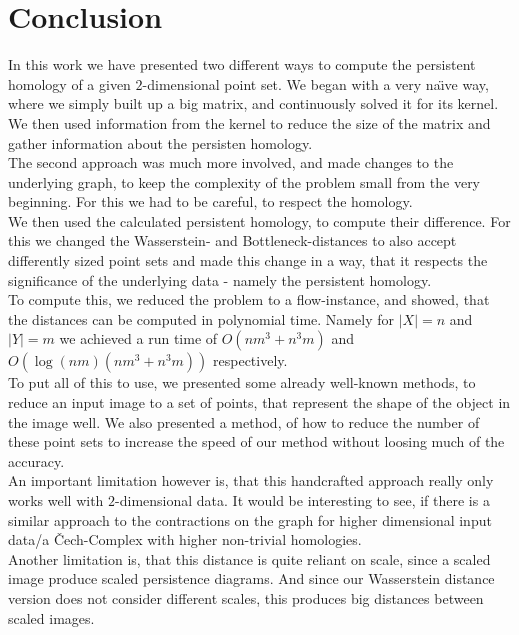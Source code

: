 \documentclass[11pt, a4paper, UKenglish]{article}
\begin{document}
    \section*{Conclusion}
    In this work we have presented two different ways to compute the persistent homology of a given $2$-dimensional point set.
    We began with a very na\"{\i}ve way, where we simply built up a big matrix, and continuously solved it for its kernel.
    We then used information from the kernel to reduce the size of the matrix and gather information about the persisten homology.\\
    The second approach was much more involved, and made changes to the underlying graph, to keep the complexity of the problem small from the very beginning.
    For this we had to be careful, to respect the homology.\\
    We then used the calculated persistent homology, to compute their difference.
    For this we changed the Wasserstein- and Bottleneck-distances to also accept differently sized point sets and made this change in a way, that it respects the significance of the underlying data - namely the persistent homology.\\
    To compute this, we reduced the problem to a flow-instance, and showed, that the distances can be computed in polynomial time.
    Namely for $|X|=n$ and $|Y|=m$ we achieved a run time of $O(nm^3+n^3 m)$ and $O(\log(nm)(nm^3+n^3 m))$ respectively.\\
    To put all of this to use, we presented some already well-known methods, to reduce an input image to a set of points, that represent the shape of the object in the image well.
    We also presented a method, of how to reduce the number of these point sets to increase the speed of our method without loosing much of the accuracy.\\
    An important limitation however is, that this handcrafted approach really only works well with $2$-dimensional data.
    It would be interesting to see, if there is a similar approach to the contractions on the graph for higher dimensional input data/a Čech-Complex with higher non-trivial homologies.\\
    Another limitation is, that this distance is quite reliant on scale, since a scaled image produce scaled persistence diagrams.
    And since our Wasserstein distance version does not consider different scales, this produces big distances between scaled images.
    \newpage
\end{document}
